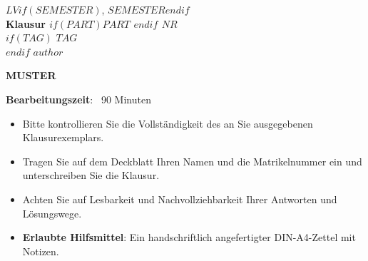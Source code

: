 
\begin{coverpages}
    \begin{minipage}[c]{0.75\textwidth}
        \parindent0pt
        \textcolor{headcolor}{\large\scshape{$LV$$if(SEMESTER)$, $SEMESTER$$endif$}}\\[1ex]
        \textcolor{headcolor}{\Large\textbf{Klausur $if(PART)$$PART$ \xspace$endif$ $NR$}}\\[2ex]
        $if(TAG)$
        \textbf{$TAG$}\\[2ex]
        $endif$
        \parindent0pt
        $author$
    \end{minipage}
    \begin{minipage}[c]{0.25\textwidth}
        \ifprintanswers
        \hfill\textcolor{dkred}{\textbf{\Huge MUSTER}}\hfill\hfill
        \fi
    \end{minipage}
    \vspace{10mm}
    \par\hrulefill\par
    \begin{minipage}[c]{0.5\textwidth}
        \begin{minipage}[c]{0.96\textwidth}
            \vspace{2mm}
            {\textbf{Bearbeitungszeit}: {\ }90 Minuten}\par
            \bigskip
            \begin{itemize}
                \item Bitte kontrollieren Sie die Vollständigkeit des an Sie
                ausgegebenen Klausurexemplars.
                \medskip
                \item Tragen Sie auf dem Deckblatt Ihren Namen und die
                Matrikelnummer ein und unterschreiben Sie die Klausur.
                \medskip
                \item Achten Sie auf Lesbarkeit und Nachvollziehbarkeit Ihrer
                Antworten und Lösungswege.
                \medskip
                \item \textbf{Erlaubte Hilfsmittel}: Ein handschriftlich
                angefertigter DIN-A4-Zettel mit Notizen.


\end{itemize}
\end{minipage}
\end{minipage}
\end{coverpages}
